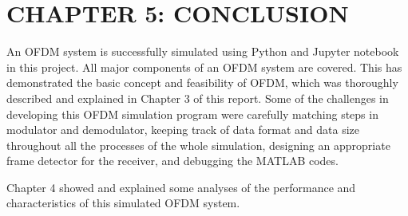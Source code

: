 \section*{CHAPTER 5: CONCLUSION}
\setcounter{section}{2}
\setcounter{subsection}{0}
\setcounter{figure}{0}
\setcounter{table}{0}

An OFDM system is successfully simulated using Python and Jupyter notebook in this project. All major components of an OFDM system are covered. This has demonstrated the basic concept and feasibility of OFDM, which was thoroughly described and explained in Chapter 3 of this report. Some of the challenges in developing this OFDM simulation program were carefully matching steps in modulator and demodulator, keeping track of data format and data size throughout all the processes of the whole simulation, designing an appropriate frame detector for the receiver, and debugging the MATLAB codes.

Chapter 4 showed and explained some analyses of the performance and characteristics of this simulated OFDM system.
